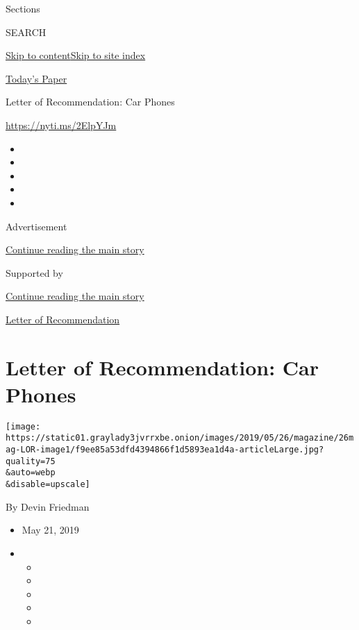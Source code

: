 Sections

SEARCH

\protect\hyperlink{site-content}{Skip to
content}\protect\hyperlink{site-index}{Skip to site index}

\href{https://myaccount.nytimes3xbfgragh.onion/auth/login?response_type=cookie\&client_id=vi}{}

\href{https://www.nytimes3xbfgragh.onion/section/todayspaper}{Today's
Paper}

Letter of Recommendation: Car Phones

\url{https://nyti.ms/2ElpYJm}

\begin{itemize}
\item
\item
\item
\item
\item
\end{itemize}

Advertisement

\protect\hyperlink{after-top}{Continue reading the main story}

Supported by

\protect\hyperlink{after-sponsor}{Continue reading the main story}

\href{/column/letter-of-recommendation}{Letter of Recommendation}

\hypertarget{letter-of-recommendation-car-phones}{%
\section{Letter of Recommendation: Car
Phones}\label{letter-of-recommendation-car-phones}}

\texttt{[image: https://static01.graylady3jvrrxbe.onion/images/2019/05/26/magazine/26mag-LOR-image1/f9ee85a53dfd4394866f1d5893ea1d4a-articleLarge.jpg?quality=75\\\&auto=webp\\\&disable=upscale]}

By Devin Friedman

\begin{itemize}
\item
  May 21, 2019
\item
  \begin{itemize}
  \item
  \item
  \item
  \item
  \item
  \end{itemize}
\end{itemize}

